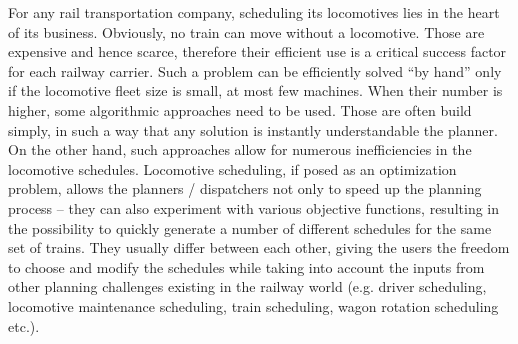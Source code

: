 For any rail transportation company, scheduling its locomotives lies in the heart of its business. Obviously, no train can move without a locomotive. Those are expensive and hence scarce, therefore their efficient use is a critical success factor for each railway carrier. 
Such a problem can be efficiently solved “by hand” only if the locomotive fleet size is small, at most few machines. When their number is higher, some algorithmic approaches need to be used. Those are often build simply, in such a way that any solution is instantly understandable the planner. On the other hand, such approaches allow for numerous inefficiencies in the locomotive schedules. 
Locomotive scheduling, if posed as an optimization problem, allows the planners / dispatchers not only to speed up the planning process – they can also experiment with various objective functions, resulting in the possibility to quickly generate a number of different schedules for the same set of trains. They usually differ between each other, giving the users the freedom to choose and modify the schedules while taking into account the inputs from other planning challenges existing in the railway world (e.g. driver scheduling, locomotive maintenance scheduling, train scheduling, wagon rotation scheduling etc.). 
